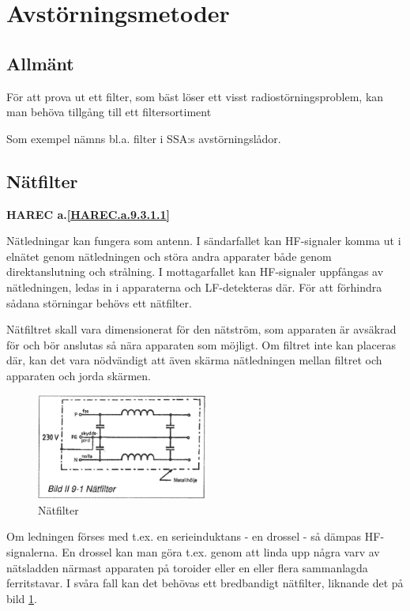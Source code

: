 \section{Avstörningsmetoder}

\subsection{Allmänt}
För att prova ut ett filter, som bäst löser ett visst
radiostörningsproblem, kan man behöva tillgång till ett
filtersortiment

Som exempel nämns bl.a. filter i SSA:s avstörningslådor.

\subsection{Nätfilter}
\textbf{
HAREC a.\ref{HAREC.a.9.3.1.1}\label{myHAREC.a.9.3.1.1}
}

Nätledningar kan fungera som antenn. I sändarfallet kan HF-signaler
komma ut i elnätet genom nätledningen och störa andra apparater både
genom direktanslutning och strålning. I mottagarfallet kan HF-signaler
uppfångas av nätledningen, ledas in i apparaterna och LF-detekteras
där. För att förhindra sådana störningar behövs ett nätfilter.

Nätfiltret skall vara dimensionerat för den nätström, som apparaten är
avsäkrad för och bör anslutas så nära apparaten som möjligt.  Om
filtret inte kan placeras där, kan det vara nödvändigt att även skärma
nätledningen mellan filtret och apparaten och jorda skärmen.

\begin{figure}
  \includegraphics[width=0.5\textwidth]{images/bild_2_9-01}
  \caption{Nätfilter}
  \label{fig:bildII9-1}
\end{figure}

Om ledningen förses med t.ex. en serieinduktans - en drossel - så
dämpas HF-signalerna. En drossel kan man göra t.ex.  genom att linda
upp några varv av nätsladden närmast apparaten på toroider eller en
eller flera sammanlagda ferritstavar. I svåra fall kan det behövas ett
bredbandigt nätfilter, liknande det på bild \ref{fig:bildII9-1}.

